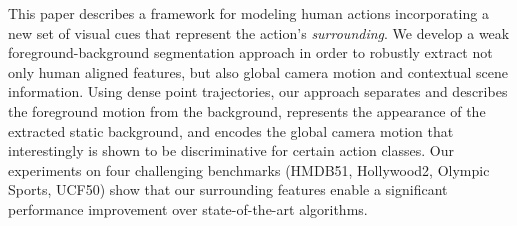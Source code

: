 This paper describes a framework for modeling human actions incorporating a new set of visual cues that represent the action's \emph{surrounding}.  We develop a weak foreground-background segmentation approach in order to robustly extract not only human aligned features, but also global camera motion and contextual scene information. Using dense point trajectories, our approach separates and describes the foreground motion from the background, represents the appearance of the extracted static background, and encodes the global camera motion that interestingly is shown to be discriminative for certain action classes. Our experiments on four challenging benchmarks (HMDB51, Hollywood2, Olympic Sports, UCF50) show that our surrounding features enable a significant performance improvement over state-of-the-art algorithms.
